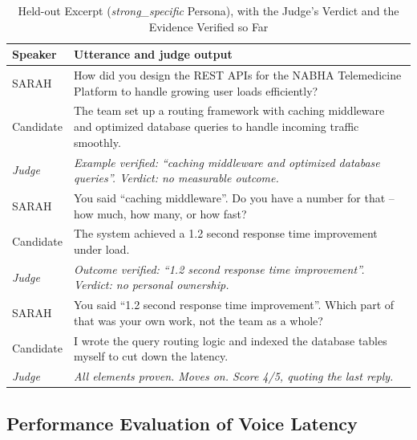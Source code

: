 \documentclass[conference]{IEEEtran}
\begin{document}
\begin{table}[t]
\caption{Held-out Excerpt (\textit{strong\_specific} Persona), with the Judge's Verdict and the Evidence Verified so Far}
\label{tab:excerpt}
\centering
\scriptsize
\renewcommand{\arraystretch}{1.0}
\begin{tabularx}{\columnwidth}{@{}l >{\raggedright\arraybackslash}X@{}}
\toprule
\textbf{Speaker} & \textbf{Utterance and judge output} \\
\midrule
SARAH & How did you design the REST APIs for the NABHA Telemedicine Platform to handle growing user loads efficiently? \\
Candidate & The team set up a routing framework with caching middleware and optimized database queries to handle incoming traffic smoothly. \\
\textit{Judge} & \textit{Example verified: ``caching middleware and optimized database queries''. Verdict: no measurable outcome.} \\
SARAH & You said ``caching middleware''. Do you have a number for that -- how much, how many, or how fast? \\
Candidate & The system achieved a 1.2 second response time improvement under load. \\
\textit{Judge} & \textit{Outcome verified: ``1.2 second response time improvement''. Verdict: no personal ownership.} \\
SARAH & You said ``1.2 second response time improvement''. Which part of that was your own work, not the team as a whole? \\
Candidate & I wrote the query routing logic and indexed the database tables myself to cut down the latency. \\
\textit{Judge} & \textit{All elements proven. Moves on. Score 4/5, quoting the last reply.} \\
\bottomrule
\end{tabularx}
\end{table}

\subsection{Performance Evaluation of Voice Latency}
\end{document}
